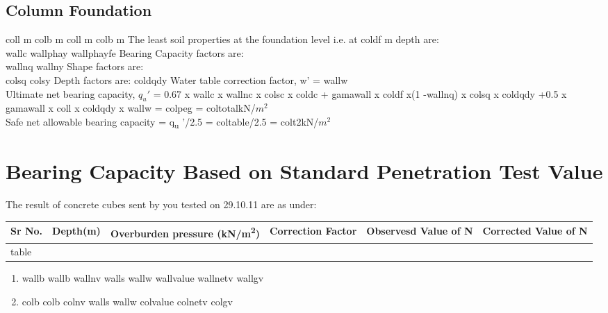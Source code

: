 \documentclass{soil12}
\begin{document}
\subsection{Column Foundation}
{
{{coll}}
 m}
{
{{colb}}
 m}
{
{{coll}}
 m}
{
{{colb}}
 m}
The least soil properties at the foundation level i.e. at {{coldf}} m depth are: \\
{
{{wallc}}
}
{
{{wallphay}}
}
{
{{wallphayfe}}
}
Bearing Capacity factors are:\\
{
{{wallnq}}
}
{
{{wallny}}
}
Shape factors are:\\
{
{{colsq}}
}
{
{{colsy}}
}
Depth factors are:
{
{{coldqdy}}
}
Water table correction factor, w' = {{wallw}} \\
Ultimate net bearing capacity, $q_u'$ = 0.67 x {{wallc}} x {{wallnc}} x {{colsc}} x {{coldc}} + {{gamawall}} x {{coldf}} x(1 -{{wallnq}}) x {{colsq}} x {{coldqdy}} 
+0.5 x {{gamawall}} x {{coll}} x {{coldqdy}} x {{wallw}} 
= {{colpeg}} = {{coltotal}}kN/$m^2$ \\ Safe net allowable bearing capacity = q\textsubscript{u} '/2.5 = {{coltable}}/2.5 = {{colt2}}kN/$m^2$
\section{Bearing Capacity Based on Standard Penetration Test Value}

\begin{center}
The result of concrete cubes sent by you tested on 29.10.11 are as under:
\end{center}
\hspace{1.1cm}
\begin{tabularx}{\textwidth}{|*{6}{l|}}
\hline
 \multicolumn{1}{|m{1cm}|}{Sr No.} &\multicolumn{1}{m{2cm}|}{Depth(m)} &\multicolumn{1}{m{2.5cm}|}{Overburden pressure (kN/m\textsuperscript{2})}
&\multicolumn{1}{m{2cm}|}{Correction Factor} &\multicolumn{1}{m{2cm}|}{Observesd Value of N} &\multicolumn{1}{m{2.9cm}|}{Corrected Value of N}\\
\hline
{{table}}
\end{tabularx}

\begin{enumerate}
\item{
{
{{wallb}}
}
{
{{wallb}}
}
{
{{wallnv}}
}
{
{{walls}}
}
{
{{wallw}}
}
{
{{wallvalue}}
}
{
{{wallnetv}}
}
{
{{wallgv}}
}
}
\item{
{
{{colb}}
}
{
{{colb}}
}
{
{{colnv}}
}
{
{{walls}}
}
{
{{wallw}}
}
{
{{colvalue}}
}
{
{{colnetv}}
}
{
{{colgv}}
}}
\end{enumerate}
\clearpage
\end{document}

